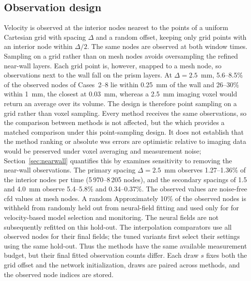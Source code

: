 \documentclass[12pt,a4paper]{article}
\newcommand{\CFD}{\ac{cfd}\xspace}
\newcommand{\WSS}{\ac{wss}\xspace}
\theoremstyle{definition}
\numberwithin{equation}{section}
\providecommand{\DIFaddtex}[1]{{\protect\color{blue} \sf #1}} %
\providecommand{\DIFdeltex}[1]{{\protect\color{red} \scriptsize #1}} %
\providecommand{\DIFaddbegin}{} %
\providecommand{\DIFaddend}{} %
\providecommand{\DIFdelbegin}{} %
\providecommand{\DIFdelend}{} %
\providecommand{\DIFadd}[1]{\texorpdfstring{\DIFaddtex{#1}}{#1}} %
\providecommand{\DIFdel}[1]{\texorpdfstring{\DIFdeltex{#1}}{}} %
\newcommand{\DIFscaledelfig}{0.5}
\newlength{\DIFdelgraphicswidth} %
\newlength{\DIFdelgraphicsheight} %
\newcommand{\DIFaddincludegraphics}[2][]{{\color{blue}\fbox{\DIFOincludegraphics[#1]{#2}}}} %
\newcommand{\DIFdelincludegraphics}[2][]{%
\sbox{\DIFdelgraphicsbox}{\DIFOincludegraphics[#1]{#2}}%
\settoboxwidth{\DIFdelgraphicswidth}{\DIFdelgraphicsbox} %
\settoboxtotalheight{\DIFdelgraphicsheight}{\DIFdelgraphicsbox} %
\scalebox{\DIFscaledelfig}{%
\parbox[b]{\DIFdelgraphicswidth}{\usebox{\DIFdelgraphicsbox}\\[-\baselineskip] \rule{\DIFdelgraphicswidth}{0em}}\llap{\resizebox{\DIFdelgraphicswidth}{\DIFdelgraphicsheight}{%
\setlength{\unitlength}{\DIFdelgraphicswidth}%
\begin{picture}(1,1)%
\thicklines\linethickness{2pt} %
{\color[rgb]{1,0,0}\put(0,0){\framebox(1,1){}}}%
{\color[rgb]{1,0,0}\put(0,0){\line( 1,1){1}}}%
{\color[rgb]{1,0,0}\put(0,1){\line(1,-1){1}}}%
\end{picture}%
}\hspace*{3pt}}} %
} %
\DeclareRobustCommand{\DIFaddbegin}{\DIFOaddbegin \let\includegraphics\DIFaddincludegraphics} %
\DeclareRobustCommand{\DIFaddend}{\DIFOaddend \let\includegraphics\DIFOincludegraphics} %
\DeclareRobustCommand{\DIFdelbegin}{\DIFOdelbegin \let\includegraphics\DIFdelincludegraphics} %
\DeclareRobustCommand{\DIFdelend}{\DIFOaddend \let\includegraphics\DIFOincludegraphics} %
\begin{document}
\subsection{Observation design}
\label{sec:observations}
Velocity is observed at the interior nodes nearest to the points of a uniform Cartesian grid with spacing $\Delta$ and a random offset, keeping only grid points with an interior node within $\Delta/2$. The same nodes are observed at both window times. Sampling on a grid rather than on mesh nodes avoids oversampling the refined near-wall layers. Each grid point is, however, snapped to a mesh node, so observations next to the wall fall on the prism layers. At $\Delta=2.5$~mm, 5.6--8.5\% of the observed nodes of Cases~2--8 lie within 0.25~mm of the wall and 26--30\% within 1~mm, the closest at 0.03~mm, whereas a 2.5~mm imaging voxel would return an average over its volume. The design is therefore point sampling on a grid rather than voxel sampling. Every method receives the same observations, \DIFdelbegin \DIFdel{so the comparison between methods is not affected, but the }\DIFdelend \DIFaddbegin \DIFadd{which provides a matched comparison under this point-sampling design. It does not establish that the method ranking or }\DIFaddend absolute \WSS errors \DIFdelbegin \DIFdel{are optimistic relative to imaging data}\DIFdelend \DIFaddbegin \DIFadd{would be preserved under voxel averaging and measurement noise}\DIFaddend ; Section~\ref{sec:nearwall} \DIFdelbegin \DIFdel{quantifies this by }\DIFdelend \DIFaddbegin \DIFadd{examines sensitivity to }\DIFaddend removing the near-wall observations. The primary spacing $\Delta=2.5$~mm observes 1.27--1.36\% of the interior nodes per time (5\,970--8\,205 nodes), and the secondary spacings of 1.5 and 4.0~mm observe 5.4--5.8\% and 0.34--0.37\%. The observed values are noise-free \CFD values at mesh nodes. \DIFdelbegin \DIFdel{A random }\DIFdelend \DIFaddbegin \DIFadd{Approximately }\DIFaddend 10\% of the observed nodes is \DIFdelbegin \DIFdel{withheld from }\DIFdelend \DIFaddbegin \DIFadd{randomly held out from neural-field }\DIFaddend fitting and used \DIFdelbegin \DIFdel{only for }\DIFdelend \DIFaddbegin \DIFadd{for velocity-based }\DIFaddend model selection and monitoring. \DIFaddbegin \DIFadd{The neural fields are not subsequently refitted on this hold-out. The interpolation comparators use all observed nodes for their final fields; the tuned variants first select their settings using the same hold-out. Thus the methods have the same available measurement budget, but their final fitted observation counts differ. }\DIFaddend Each draw $s$ fixes both the grid offset and the network initialization, draws are paired across methods, and the observed node indices are stored.
\end{document}
